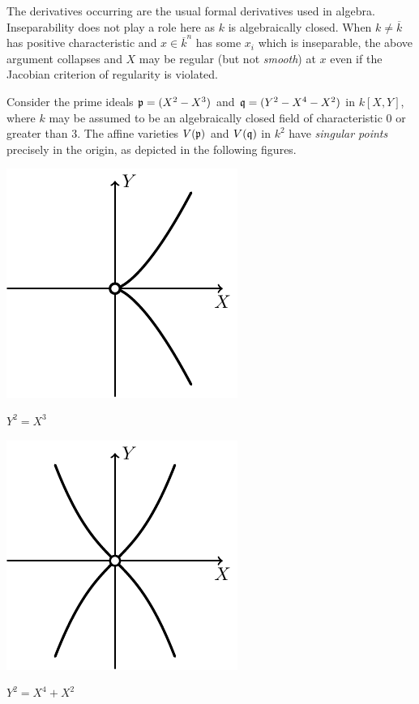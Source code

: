 \documentclass[a4paper,parskip=half,numbers=enddot, DIV=12]{scrreprt}
\begin{document}
\begin{rem*}
    The derivatives occurring are the usual formal derivatives used in algebra. Inseparability does not play a role here as $k$ is algebraically closed. When $k\neq \overline{k}$ has positive characteristic and $x\in \overline{k}^n$ has some $x_i$ which is inseparable, the above argument collapses and $X$ may be regular (but not \emph{smooth}) at $x$ even if the Jacobian criterion of regularity is violated.
\end{rem*}
\begin{example*}
    Consider the prime ideals $\mathfrak{p}= (X^2-X^3)$ and $\mathfrak{q} = (Y^2-X^4-X^2)$ in $k[X,Y]$, where $k$ may be assumed to be an algebraically closed field of characteristic $0$ or greater than $3$. The affine varieties $V(\mathfrak{p})$ and $V(\mathfrak{q})$ in $k^2$ have \emph{singular points} precisely in the origin, as depicted in the following figures.
\end{example*}
\begin{center}
	\begin{minipage}{0.42\textwidth}
		\centering
		\includegraphics{Curve1.pdf}
		
		$Y^2=X^3$
	\end{minipage}
	\begin{minipage}{0.42\textwidth}
		\centering
		\includegraphics{Curve2.pdf}
		
		$Y^2=X^4+X^2$
	\end{minipage}
\end{center}
\end{document}
